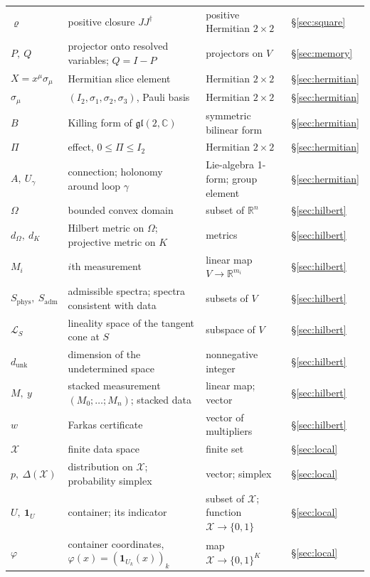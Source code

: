 \documentclass[11pt]{article}
\theoremstyle{boldplain}
\theoremstyle{boldupright}
\newcommand{\Xs}{\mathcal{X}}
\newcommand{\one}{\mathbf{1}}
\newcommand{\dunk}{d_{\mathrm{unk}}}
\newcommand{\Sphys}{S_{\mathrm{phys}}}
\newcommand{\Sadm}{S_{\mathrm{adm}}}
\begin{document}
{\begin{longtable}{@{}l p{2.7in} p{2.0in} l@{}}
$\varrho$ & positive closure $JJ^\dagger$ & positive Hermitian $2\times2$ & \S\ref{sec:square}\\
$P,\ Q$ & projector onto resolved variables; $Q=I-P$ & projectors on $V$ & \S\ref{sec:memory}\\
$X=x^\mu\sigma_\mu$ & Hermitian slice element & Hermitian $2\times2$ & \S\ref{sec:hermitian}\\
$\sigma_\mu$ & $(I_2,\sigma_1,\sigma_2,\sigma_3)$, Pauli basis & Hermitian $2\times2$ & \S\ref{sec:hermitian}\\
$B$ & Killing form of $\mathfrak{gl}(2,\mathbb{C})$ & symmetric bilinear form & \S\ref{sec:hermitian}\\
$\Pi$ & effect, $0\le\Pi\le I_2$ & Hermitian $2\times2$ & \S\ref{sec:hermitian}\\
$A,\ U_\gamma$ & connection; holonomy around loop $\gamma$ & Lie-algebra 1-form; group element & \S\ref{sec:hermitian}\\
$\Omega$ & bounded convex domain & subset of $\mathbb{R}^n$ & \S\ref{sec:hilbert}\\
$d_\Omega,\ d_K$ & Hilbert metric on $\Omega$; projective metric on $K$ & metrics & \S\ref{sec:hilbert}\\
$M_i$ & $i$th measurement & linear map $V\to\mathbb{R}^{m_i}$ & \S\ref{sec:hilbert}\\
$\Sphys,\ \Sadm$ & admissible spectra; spectra consistent with data & subsets of $V$ & \S\ref{sec:hilbert}\\
$\mathcal{L}_S$ & lineality space of the tangent cone at $S$ & subspace of $V$ & \S\ref{sec:hilbert}\\
$\dunk$ & dimension of the undetermined space & nonnegative integer & \S\ref{sec:hilbert}\\
$M,\ y$ & stacked measurement $(M_0;\dots;M_n)$; stacked data & linear map; vector & \S\ref{sec:hilbert}\\
$w$ & Farkas certificate & vector of multipliers & \S\ref{sec:hilbert}\\
$\Xs$ & finite data space & finite set & \S\ref{sec:local}\\
$p,\ \Delta(\Xs)$ & distribution on $\Xs$; probability simplex & vector; simplex & \S\ref{sec:local}\\
$U,\ \one_U$ & container; its indicator & subset of $\Xs$; function $\Xs\to\{0,1\}$ & \S\ref{sec:local}\\
$\varphi$ & container coordinates, $\varphi(x)=(\one_{U_k}(x))_k$ & map $\Xs\to\{0,1\}^K$ & \S\ref{sec:local}\\

\end{longtable}}
\end{document}
